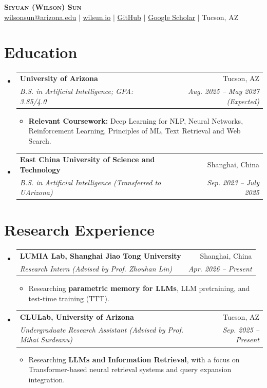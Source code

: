 \documentclass[letterpaper,11pt]{article}
\makeatletter
\newcommand{\resumeItem}[1]{
  \item\small{
    {#1 \vspace{-2pt}}
  }
}
\newcommand{\resumeSubheading}[4]{
  \vspace{-2pt}\item
    \begin{tabular*}{0.97\textwidth}[t]{l@{\extracolsep{\fill}}r}
      \textbf{#1} & #2 \\
      \textit{\small#3} & \textit{\small #4} \\
    \end{tabular*}\vspace{-7pt}
}
\newcommand{\resumeSubHeadingListStart}{\begin{itemize}[leftmargin=0.15in, label={}]}
\newcommand{\resumeSubHeadingListEnd}{\end{itemize}}
\newcommand{\resumeItemListStart}{\begin{itemize}}
\newcommand{\resumeItemListEnd}{\end{itemize}\vspace{-5pt}}
\makeatother
\begin{document}
\begin{center}
    \textbf{\Huge \scshape Siyuan (Wilson) Sun} \\ \vspace{2pt}
    \small \href{mailto:wilsonsun@arizona.edu}{\underline{wilsonsun@arizona.edu}} $|$
    \href{https://wilsun.io}{\underline{wilsun.io}} $|$
    \href{https://github.com/ws-uofa}{\underline{GitHub}} $|$
    \href{https://scholar.google.com/citations?user=6xnACBMAAAAJ}{\underline{Google Scholar}} $|$
    \small Tucson, AZ
\end{center}

\section{Education}
  \resumeSubHeadingListStart
    \resumeSubheading
      {University of Arizona}{Tucson, AZ}
      {B.S. in Artificial Intelligence; GPA: 3.85/4.0}{Aug. 2025 -- May 2027 (Expected)}
      \resumeItemListStart
        \resumeItem{\textbf{Relevant Coursework:} Deep Learning for NLP, Neural Networks, Reinforcement Learning, Principles of ML, Text Retrieval and Web Search.}
      \resumeItemListEnd
    \resumeSubheading
      {East China University of Science and Technology}{Shanghai, China}
      {B.S. in Artificial Intelligence (Transferred to UArizona)}{Sep. 2023 -- July 2025}
  \resumeSubHeadingListEnd

\section{Research Experience}
  \resumeSubHeadingListStart
    \resumeSubheading
      {LUMIA Lab, Shanghai Jiao Tong University}{Shanghai, China}
      {Research Intern (Advised by Prof. Zhouhan Lin)}{Apr. 2026 -- Present}
      \resumeItemListStart
        \resumeItem{Researching \textbf{parametric memory for LLMs}, LLM pretraining, and test-time training (TTT).}
      \resumeItemListEnd
    \resumeSubheading
      {CLULab, University of Arizona}{Tucson, AZ}
      {Undergraduate Research Assistant (Advised by Prof. Mihai Surdeanu)}{Sep. 2025 -- Present}
      \resumeItemListStart
        \resumeItem{Researching \textbf{LLMs and Information Retrieval}, with a focus on Transformer-based neural retrieval systems and query expansion integration.}
      \resumeItemListEnd
  \resumeSubHeadingListEnd

\end{document}
